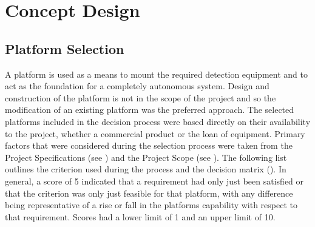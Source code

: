 \documentclass[main.tex]{subfiles}
\begin{document}
\chapter{Concept Design}

\section{Platform Selection}
A platform is used as a means to mount the required detection equipment and to act as the foundation for a completely autonomous system.  Design and construction of the platform is not in the scope of the project and so the modification of an existing platform was the preferred approach. The selected platforms included in the decision process were based directly on their availability to the project, whether a commercial product or the loan of equipment. Primary factors that were considered during the selection process were taken from the Project Specifications (see ) and the Project Scope (see ). The following list outlines the criterion used during the process and the decision matrix (). In general, a score of 5 indicated that a requirement had only just been satisfied or that the criterion was only just feasible for that platform, with any difference being representative of a rise or fall in the platforms capability with respect to that requirement. Scores had a lower limit of 1 and an upper limit of 10.
\end{document}
